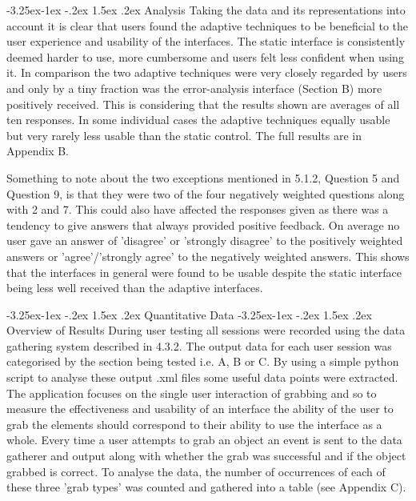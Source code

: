 \documentclass[12pt]{article}
\makeatletter
\renewcommand{\subsection}{\@startsection{subsection}{2}{\z@}%
             {-3.25ex\@plus -1ex \@minus -.2ex}%
             {1.5ex \@plus .2ex}%
             {\normalfont\large\scshape\bfseries}}
\renewcommand{\subsubsection}{\@startsection{subsubsection}{2}{\z@}%
             {-3.25ex\@plus -1ex \@minus -.2ex}%
             {1.5ex \@plus .2ex}%
             {\normalfont\normalsize\scshape\bfseries}}
\makeatother
\begin{document}
\subsubsection{Analysis}
Taking the data and its representations into account it is clear that users found the adaptive techniques to be beneficial to the user experience and usability of the interfaces. The static interface is consistently deemed harder to use, more cumbersome and users felt less confident when using it. In comparison the two adaptive techniques were very closely regarded by users and only by a tiny fraction was the error-analysis interface (Section B) more positively received. This is considering that the results shown are averages of all ten responses. In some individual cases the adaptive techniques equally usable but very rarely less usable than the static control. The full results are in Appendix B.

Something to note about the two exceptions mentioned in 5.1.2, Question 5 and Question 9, is that they were two of the four negatively weighted questions along with 2 and 7. This could also have affected the responses given as there was a tendency to give answers that always provided positive feedback. On average no user gave an answer of 'disagree' or 'strongly disagree' to the positively weighted answers or 'agree'/'strongly agree' to the negatively weighted answers. This shows that the interfaces in general were found to be usable despite the static interface being less well received than the adaptive interfaces.

\subsection{Quantitative Data}
\subsubsection{Overview of Results}
During user testing all sessions were recorded using the data gathering system described in 4.3.2. The output data for each user session was categorised by the section being tested i.e. A, B or C. By using a simple python script to analyse these output .xml files some useful data points were extracted. The application focuses on the single user interaction of grabbing and so to measure the effectiveness and usability of an interface the ability of the user to grab the elements should correspond to their ability to use the interface as a whole. Every time a user attempts to grab an object an event is sent to the data gatherer and output along with whether the grab was successful and if the object grabbed is correct. To analyse the data, the number of occurrences of each of these three 'grab types' was counted and gathered into a table (see Appendix C). 
\end{document}
